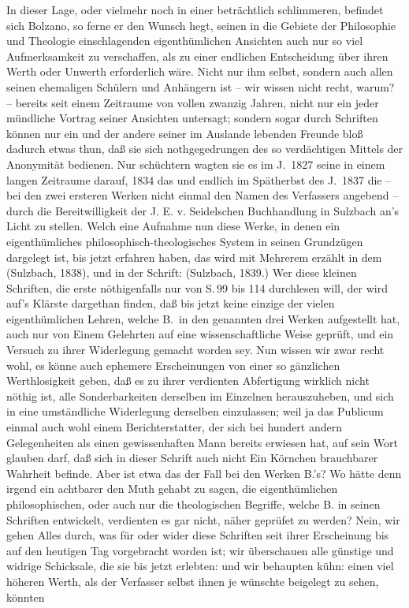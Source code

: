 In dieser Lage, oder vielmehr noch in einer beträchtlich schlimmeren, befindet sich Bolzano, so ferne er den Wunsch hegt, seinen in die Gebiete der Philosophie und Theologie einschlagenden eigenthümlichen Ansichten auch nur so viel Aufmerksamkeit zu verschaffen, als zu einer endlichen Entscheidung über ihren Werth oder Unwerth erforderlich wäre. Nicht nur ihm selbst, sondern auch allen seinen ehemaligen Schülern und Anhängern ist -- wir wissen nicht recht, warum? -- bereits seit einem Zeitraume von vollen zwanzig Jahren, nicht nur ein jeder mündliche Vortrag seiner Ansichten untersagt; sondern sogar durch Schriften können nur ein und der andere seiner im Auslande lebenden Freunde bloß dadurch etwas thun, daß sie sich nothgegedrungen des so verdächtigen Mittels der Anonymität bedienen. Nur schüchtern wagten sie es im J.~1827 seine  in einem langen Zeitraume darauf, 1834 das  und endlich im Spätherbst des J.~1837 die  -- bei den zwei ersteren Werken nicht einmal den Namen des Verfassers angebend -- durch die Bereitwilligkeit der J. E. v. Seidelschen Buchhandlung in Sulzbach an's Licht zu stellen. Welch eine Aufnahme nun diese Werke, in denen ein eigenthümliches philosophisch-theologisches System in seinen Grundzügen dargelegt ist, bis jetzt erfahren haben, das wird mit Mehrerem erzählt in dem  (Sulzbach, 1838), und in der Schrift:  (Sulzbach, 1839.) Wer diese kleinen Schriften, die erste nöthigenfalls nur von S.\,99 bis 114 durchlesen will, der wird auf's Klärste dargethan finden, daß bis jetzt keine einzige der vielen eigenthümlichen Lehren, welche B.\ in den genannten drei Werken aufgestellt hat, auch nur von Einem Gelehrten auf eine wissenschaftliche Weise geprüft, und ein Versuch zu ihrer Widerlegung gemacht worden sey. Nun wissen wir zwar recht wohl, es könne auch ephemere Erscheinungen von einer so gänzlichen Werthlosigkeit geben, daß es zu ihrer verdienten Abfertigung wirklich nicht nöthig ist, alle Sonderbarkeiten derselben im Einzelnen herauszuheben, und sich in eine umständliche Widerlegung derselben einzulassen; weil ja das Publicum einmal auch wohl einem Berichterstatter, der sich bei hundert andern Gelegenheiten als einen gewissenhaften Mann bereits erwiesen hat, auf sein Wort glauben darf, daß sich in dieser Schrift auch nicht Ein Körnchen brauchbarer Wahrheit befinde. Aber ist etwa das der Fall bei den Werken B.'s? Wo hätte denn irgend ein achtbarer  den Muth gehabt zu sagen, die eigenthümlichen philosophischen, oder auch nur die theologischen Begriffe,   welche B. in seinen Schriften entwickelt, verdienten es gar nicht, näher geprüfet zu werden? Nein, wir gehen Alles durch, was für oder wider diese Schriften seit ihrer Erscheinung bis auf den heutigen Tag vorgebracht worden ist; wir  überschauen alle günstige und widrige Schicksale, die sie bis jetzt erlebten: und wir behaupten kühn: einen viel höheren  Werth, als der Verfasser selbst ihnen je wünschte beigelegt zu sehen, könnten 